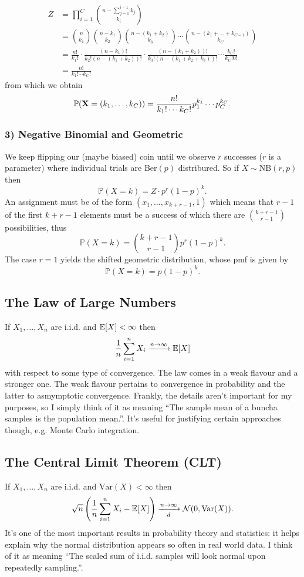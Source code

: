 \documentclass[11pt]{article}
\begin{document}
\begin{appendices}
\begin{align*}
    Z
    &=
    \prod_{i=1}^C\binom{n-\sum_{j=1}^{i-1}k_j}{k_i}\\
    &=
    \binom{n}{k_1}\binom{n-k_1}{k_2}\binom{n-(k_1+k_2)}{k_3}\cdots\binom{n-(k_1+\dots+k_{C-1})}{k_C}\\
    &=
    \frac{n!}{k_1!}\cdot\frac{(n-k_1)!}{k_2!(n-(k_1+k_2))!}\cdot\frac{(n-(k_1+k_2))!}{k_3!(n-(k_1+k_2+k_3))!}\cdots\frac{k_C!}{k_C!0!}\\
    &=
    \frac{n!}{k_1!\cdots k_C!}
\end{align*}
from which we obtain
$$
\mathbb{P}(\mathbf{X}=(k_1,\dots,k_C))
=
\frac{n!}{k_1!\cdots k_C!}p_1^{k_1}\cdots p_C^{k_C}.
$$

\subsubsection*{3) Negative Binomial and Geometric}
We keep flipping our (maybe biased) coin until we observe $r$ successes ($r$ is a parameter) where individual trials are Ber$(p)$ distribured. So if $X\sim\text{NB}(r,p)$ then
$$
\mathbb{P}(X=k)
=
Z\cdot p^r(1-p)^k.
$$
An assignment must be of the form $(x_1,\dots,x_{k+r-1},1)$ which means that $r-1$ of the first $k+r-1$ elements must be a success of which there are $\binom{k+r-1}{r-1}$ possibilities, thus
$$
\mathbb{P}(X=k)
=
\binom{k+r-1}{r-1}p^r(1-p)^k.
$$
The case $r=1$ yields the shifted geometric distribution, whose pmf is given by
$$
\mathbb{P}(X=k)
=
p(1-p)^k.
$$

\subsection{The Law of Large Numbers}
If $X_1,\dots,X_n$ are i.i.d. and $\mathbb{E}[X]<\infty$ then
$$
\frac{1}{n}\sum_{i=1}^n X_i
\xrightarrow{n\to\infty}
\mathbb{E}[X]
$$
with respect to some type of convergence. The law comes in a weak flavour and a stronger one. The weak flavour pertains to convergence in probability and the latter to asmymptotic convergence. Frankly, the details aren't important for my purposes, so I simply think of it as meaning ``The sample mean of a buncha samples is the population mean.''. It's useful for justifying certain approaches though, e.g. Monte Carlo integration.

\subsection{The Central Limit Theorem (CLT)}
If $X_1,\dots,X_n$ are i.i.d. and $\text{Var}(X)<\infty$ then
$$
\sqrt{n}\left(\frac{1}{n}\sum_{i=1}^nX_i-\mathbb{E}[X]\right)
\xrightarrow[d]{n\to\infty}
\mathcal{N}(0,\text{Var}(X)).
$$
It's one of the most important results in probability theory and statistics: it helps explain why the normal distribution appears so often in real world data. I think of it as meaning ``The scaled sum of i.i.d. samples will look normal upon repeatedly sampling.''.


\end{appendices}
\end{document}
